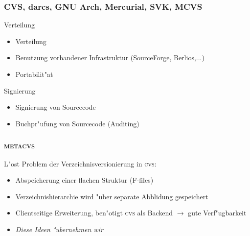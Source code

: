 \documentclass[german]{beamer}
\newcommand{\METACVS}{\textsc{metacvs}}
\newcommand{\CVS}{\textsc{cvs}}
\begin{document}
\begin{frame}
  \frametitle{CVS, darcs, GNU Arch, Mercurial, SVK, MCVS}
  \begin{block}{Verteilung}
    \begin{itemize}
    \item Verteilung
    \item Benutzung vorhandener Infrastruktur (SourceForge, Berlios,...)
    \item Portabilit"at
    \end{itemize}
  \end{block}
  \begin{block}{Signierung}
    \begin{itemize}
    \item Signierung von Sourcecode
    \item Buchpr"ufung von Sourcecode (Auditing)
    \end{itemize}
  \end{block}
  
\end{frame}

\begin{frame}
  \frametitle{\METACVS}
  L"ost Problem der Verzeichnisversionierung in \CVS:
  \begin{itemize}
  \item Abspeicherung einer flachen Struktur (F-files)
  \item Verzeichnishierarchie wird "uber separate Abblidung
    gespeichert
  \item Clientseitige Erweiterung, ben"otigt \CVS{} als Backend
    $\rightarrow$ gute Verf"ugbarkeit
  \item \emph{Diese Ideen "ubernehmen wir}
  \end{itemize}
\end{frame}
\end{document}
